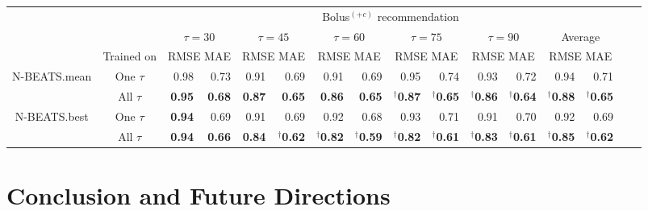 \documentclass[journal,article,submit,moreauthors,pdftex]{Definitions/mdpi}
\begin{document}
\begin{table}[t]
\begin{center}
\begin{tabular}{|c|c|rr|rr|rr|rr|rr|rr|rr}
    \cline{3-14}
    \multicolumn{2}{c|}{} & \multicolumn{12}{c|}{Bolus$^{(+c)}$ recommendation}\\
    \cline{3-14}
    \multicolumn{2}{c|}{} & \multicolumn{2}{c|}{$\tau=30$} & \multicolumn{2}{c|}{$\tau=45$} & \multicolumn{2}{c|}{$\tau=60$} & \multicolumn{2}{c|}{$\tau=75$} & \multicolumn{2}{c|}{$\tau=90$} & \multicolumn{2}{c|}{Average}\\
    \cline{2-14}
     \multicolumn{1}{c|}{}& Trained on & \multicolumn{2}{c|}{\scriptsize RMSE MAE} & \multicolumn{2}{c|}{\scriptsize RMSE MAE} & \multicolumn{2}{c|}{\scriptsize RMSE MAE} & \multicolumn{2}{c|}{\scriptsize RMSE MAE} & \multicolumn{2}{c|}{\scriptsize RMSE MAE} & \multicolumn{2}{c|}{\scriptsize RMSE MAE} \\
    \hline
    \multirow{2}{*}{N-BEATS.mean} & One $\tau$ & 0.98 & 0.73 & 0.91 & 0.69 & 0.91 & 0.69 & 0.95 & 0.74 & 0.93 & 0.72 & 0.94 & 0.71\\
    & All $\tau$ & {\bf 0.95} & {\bf 0.68} & {\bf 0.87} & {\bf 0.65} & {\bf 0.86} & {\bf 0.65} & $^\dagger${\bf 0.87} & $^\dagger${\bf 0.65} & $^\dagger${\bf 0.86} & $^\dagger${\bf 0.64} & $^\dagger${\bf 0.88} & $^\dagger${\bf 0.65}\\
    \hline
    \multirow{2}{*}{N-BEATS.best} & One $\tau$ & {\bf 0.94} & 0.69 & 0.91 & 0.69 & 0.92 & 0.68 & 0.93 & 0.71 & 0.91 & 0.70 & 0.92 & 0.69\\
    & All $\tau$ & {\bf 0.94} & {\bf 0.66} & {\bf 0.84} & $^\dagger${\bf 0.62} & $^\dagger${\bf 0.82} & $^\dagger${\bf 0.59} & $^\dagger${\bf 0.82} & $^\dagger${\bf 0.61} & $^\dagger${\bf 0.83} & $^\dagger${\bf 0.61} & $^\dagger${\bf 0.85} & $^\dagger${\bf 0.62}\\
    \hline
\end{tabular}
\end{center}
\end{table}

\section{Conclusion and Future Directions}
\label{sec:conclusion}
\end{document}
